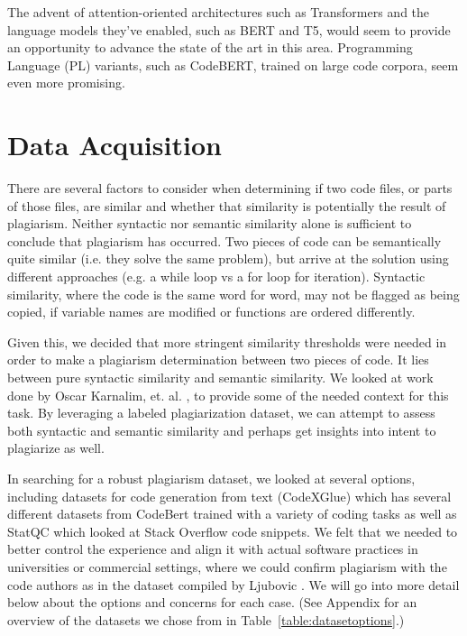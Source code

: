 \documentclass[twocolumn]{article}
\begin{document}
The advent of attention-oriented architectures such as Transformers \cite{viswani} and the language models they've enabled, such as BERT\cite{devlin} and T5\cite{raffel}, would seem to provide an opportunity to advance the state of the art in this area. Programming Language (PL) variants, such as CodeBERT, trained on large code corpora, seem even more promising. 



\section{\large Data Acquisition}

There are several factors to consider when determining if two code files, or parts of those files, are similar and whether that similarity is potentially the result of plagiarism. Neither syntactic nor semantic similarity alone is sufficient to conclude that plagiarism has occurred. Two pieces of code can be semantically quite similar (i.e. they solve the same problem), but arrive at the solution using different approaches (e.g. a while loop vs a for loop for iteration). Syntactic similarity, where the code is the same word for word, may not be flagged as being copied,  if variable names are modified or functions are ordered differently. 


Given this, we decided that more stringent similarity thresholds were needed in order to make a plagiarism determination between two pieces of code. It lies between pure syntactic similarity and semantic similarity. We looked at work done by Oscar Karnalim, et. al. \cite{karnalim2019}, to provide some of the needed context for this task. By leveraging a labeled plagiarization dataset, we can attempt to assess both syntactic and semantic similarity and perhaps get insights into intent to plagiarize as well. 

In searching for a robust plagiarism dataset, we looked at several options, including datasets for code generation from text (CodeXGlue) which has several different datasets from CodeBert trained with a variety of coding tasks\cite{lu} as well as StatQC \cite{yin} which looked at Stack Overflow code snippets. We felt that we needed to better control the experience and align it with actual software practices in universities or commercial settings, where we could confirm plagiarism with the code authors as in the dataset compiled by Ljubovic \cite{ljubovic}. We will go into more detail below about the options and concerns for each case. (See Appendix for an overview of the datasets we chose from in Table~\ref{table:datasetoptions}.)
\end{document}
